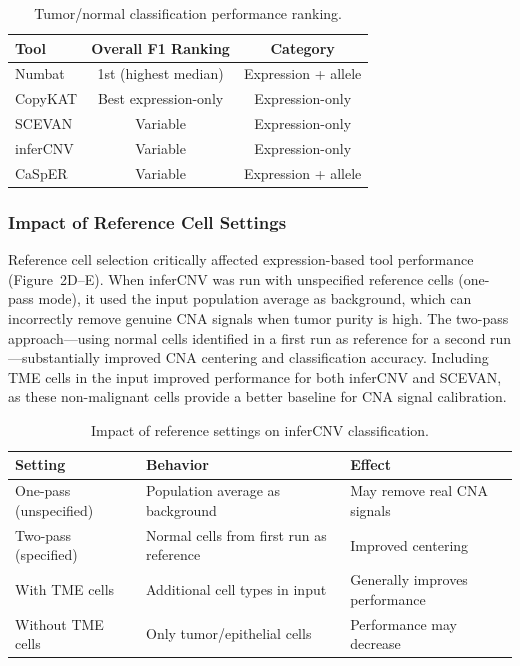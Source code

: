 \documentclass[11pt]{article}
\begin{document}
\begin{table}[H]
\centering
\caption{Tumor/normal classification performance ranking.}
\label{tab:classification}
\begin{tabular}{lcc}
\toprule
Tool & Overall F1 Ranking & Category \\
\midrule
Numbat & 1st (highest median) & Expression + allele \\
CopyKAT & Best expression-only & Expression-only \\
SCEVAN & Variable & Expression-only \\
inferCNV & Variable & Expression-only \\
CaSpER & Variable & Expression + allele \\
\bottomrule
\end{tabular}
\end{table}

\subsubsection{Impact of Reference Cell Settings}

Reference cell selection critically affected expression-based tool performance (Figure~2D--E). When inferCNV was run with unspecified reference cells (one-pass mode), it used the input population average as background, which can incorrectly remove genuine CNA signals when tumor purity is high. The two-pass approach---using normal cells identified in a first run as reference for a second run---substantially improved CNA centering and classification accuracy. Including TME cells in the input improved performance for both inferCNV and SCEVAN, as these non-malignant cells provide a better baseline for CNA signal calibration.

\begin{table}[H]
\centering
\caption{Impact of reference settings on inferCNV classification.}
\label{tab:reference}
\begin{tabular}{lll}
\toprule
Setting & Behavior & Effect \\
\midrule
One-pass (unspecified) & Population average as background & May remove real CNA signals \\
Two-pass (specified) & Normal cells from first run as reference & Improved centering \\
With TME cells & Additional cell types in input & Generally improves performance \\
Without TME cells & Only tumor/epithelial cells & Performance may decrease \\
\bottomrule
\end{tabular}
\end{table}
\end{document}
